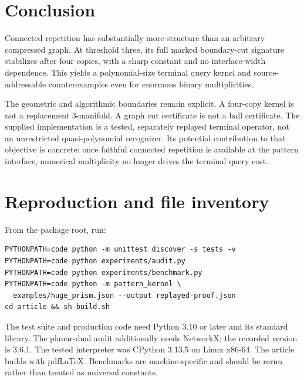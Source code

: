 \documentclass[11pt]{article}
\theoremstyle{remark}\newtheorem{remark}[theorem]{Remark}
\begin{document}
\section{Conclusion}
Connected repetition has substantially more structure than an arbitrary compressed graph. At threshold three, its full marked boundary-cut signature stabilizes after four copies, with a sharp constant and no interface-width dependence. This yields a polynomial-size terminal query kernel and source-addressable counterexamples even for enormous binary multiplicities.

The geometric and algorithmic boundaries remain explicit. A four-copy kernel is not a replacement 3-manifold. A graph cut certificate is not a ball certificate. The supplied implementation is a tested, separately replayed terminal operator, not an unrestricted quasi-polynomial recognizer. Its potential contribution to that objective is concrete: once faithful connected repetition is available at the pattern interface, numerical multiplicity no longer drives the terminal query cost.

\appendix
\section{Reproduction and file inventory}
From the package root, run:
\begin{verbatim}
PYTHONPATH=code python -m unittest discover -s tests -v
PYTHONPATH=code python experiments/audit.py
PYTHONPATH=code python experiments/benchmark.py
PYTHONPATH=code python -m pattern_kernel \
  examples/huge_prism.json --output replayed-proof.json
cd article && sh build.sh
\end{verbatim}
The test suite and production code need Python 3.10 or later and its standard library. The planar-dual audit additionally needs NetworkX; the recorded version is 3.6.1. The tested interpreter was CPython 3.13.5 on Linux x86-64. The article builds with pdf\LaTeX. Benchmarks are machine-specific and should be rerun rather than treated as universal constants.
\end{document}
